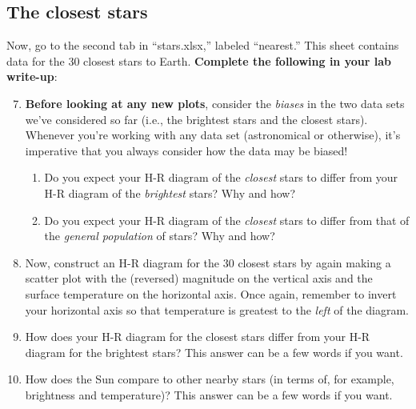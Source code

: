 \documentclass[11pt]{article}
\begin{document}
\subsection{The closest stars}
Now, go to the second tab in ``stars.xlsx,'' labeled ``nearest.'' This sheet contains data for the 30 closest stars to Earth. \textbf{Complete the following in your lab write-up}:
\begin{enumerate}
\setcounter{enumi}{6}

    \item \textbf{Before looking at any new plots}, consider the \emph{biases} in the two data sets we've considered so far (i.e., the brightest stars and the closest stars). Whenever you're working with any data set (astronomical or otherwise), it's imperative that you always consider how the data may be biased!
    \begin{enumerate}
        \item Do you expect your H-R diagram of the \emph{closest} stars to differ from your H-R diagram of the \emph{brightest} stars? Why and how?
        
        \item Do you expect your H-R diagram of the \emph{closest} stars to differ from that of the \emph{general population} of stars? Why and how?
    \end{enumerate}
    
    \item Now, construct an H-R diagram for the 30 closest stars by again making a scatter plot with the (reversed) magnitude on the vertical axis and the surface temperature on the horizontal axis. Once again, remember to invert your horizontal axis so that temperature is greatest to the \emph{left} of the diagram.
    
    \item How does your H-R diagram for the closest stars differ from your H-R diagram for the brightest stars? This answer can be a few words if you want.
    
    \item How does the Sun compare to other nearby stars (in terms of, for example, brightness and temperature)? This answer can be a few words if you want.
    
\end{enumerate}
\end{document}
